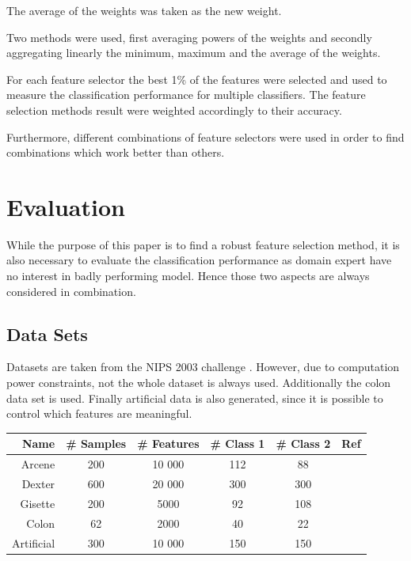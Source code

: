 \documentclass[twoside,11pt]{article}
\begin{document}
\begin{description}[align=left]
\item [Linear aggregation :] The average of the weights was taken as the new weight.
\item [Non-linear aggregation :] Two methods were used, first averaging powers of the weights and secondly aggregating linearly the minimum, maximum and the average of the weights.
\item [Performance related aggregation :] For each feature selector the best 1\% of the features were selected and used to measure the classification performance for multiple classifiers. The feature selection methods result were weighted accordingly to their accuracy.
\end{description}

Furthermore, different combinations of feature selectors were used in order to find combinations which work better than others.

\section{Evaluation}

While the purpose of this paper is to find a robust feature selection method, it is also necessary to evaluate the classification performance as domain expert have no interest in badly performing model. Hence those two aspects are always considered in combination.

\subsection{Data Sets}
Datasets are taken from the NIPS 2003 challenge \cite{NIPS}. However, due to computation power constraints, not the whole dataset is always used. Additionally the colon data set \cite{alon1999broad} is used. Finally artificial data is also generated, since it is possible to control which features are meaningful. 

\begin{center}
    \begin{tabular}{| r | c | c | c | c | c |}
    \hline
    Name & \# Samples & \# Features & \# Class 1 & \# Class 2 & Ref\\ \hline
    Arcene & 200 & 10 000 & 112 & 88 & \cite{NIPS} \\
    Dexter & 600 & 20 000 & 300 & 300 & \cite{NIPS} \\
    Gisette & 200 & 5000 & 92 & 108 & \cite{NIPS} \\
    Colon & 62 & 2000 & 40 & 22 &  \cite{alon1999broad} \\
    Artificial & 300 & 10 000 & 150 & 150 & \\
    \hline
    \end{tabular}
\end{center}
\end{document}
